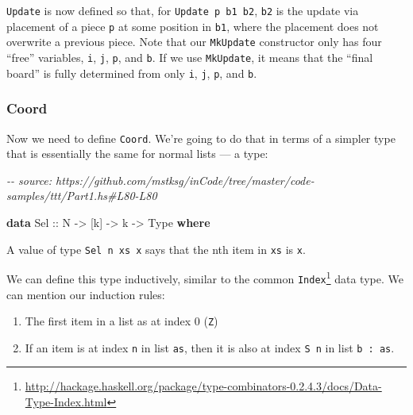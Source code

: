 \documentclass[]{article}
\newenvironment{Shaded}{}{}
\newcommand{\CommentTok}[1]{\textcolor[rgb]{0.38,0.63,0.69}{\textit{#1}}}
\newcommand{\DataTypeTok}[1]{\textcolor[rgb]{0.56,0.13,0.00}{#1}}
\newcommand{\KeywordTok}[1]{\textcolor[rgb]{0.00,0.44,0.13}{\textbf{#1}}}
\newcommand{\NormalTok}[1]{#1}
\newcommand{\OtherTok}[1]{\textcolor[rgb]{0.00,0.44,0.13}{#1}}
\renewcommand{\href}[2]{#2\footnote{\url{#1}}}
\begin{document}
\texttt{Update} is now defined so that, for \texttt{Update\ p\ b1\ b2},
\texttt{b2} is the update via placement of a piece \texttt{p} at some position
in \texttt{b1}, where the placement does not overwrite a previous piece. Note
that our \texttt{MkUpdate} constructor only has four ``free'' variables,
\texttt{i}, \texttt{j}, \texttt{p}, and \texttt{b}. If we use \texttt{MkUpdate},
it means that the ``final board'' is fully determined from only \texttt{i},
\texttt{j}, \texttt{p}, and \texttt{b}.

\hypertarget{coord}{%
\subsubsection{Coord}\label{coord}}

Now we need to define \texttt{Coord}. We're going to do that in terms of a
simpler type that is essentially the same for normal lists --- a type:

\begin{Shaded}
\begin{Highlighting}[]
\CommentTok{{-}{-} source: https://github.com/mstksg/inCode/tree/master/code{-}samples/ttt/Part1.hs\#L80{-}L80}

\KeywordTok{data} \DataTypeTok{Sel}\OtherTok{ ::} \DataTypeTok{N} \OtherTok{{-}>}\NormalTok{ [k] }\OtherTok{{-}>}\NormalTok{ k }\OtherTok{{-}>} \DataTypeTok{Type} \KeywordTok{where}
\end{Highlighting}
\end{Shaded}

A value of type \texttt{Sel\ n\ xs\ x} says that the nth item in \texttt{xs} is
\texttt{x}.

We can define this type inductively, similar to the common
\href{http://hackage.haskell.org/package/type-combinators-0.2.4.3/docs/Data-Type-Index.html}{\texttt{Index}}
data type. We can mention our induction rules:

\begin{enumerate}
\def\labelenumi{\arabic{enumi}.}
\tightlist
\item
  The first item in a list as at index 0 (\texttt{Z})
\item
  If an item is at index \texttt{n} in list \texttt{as}, then it is also at
  index \texttt{S\ n} in list \texttt{b\ \textquotesingle{}:\ as}.
\end{enumerate}
\end{document}
